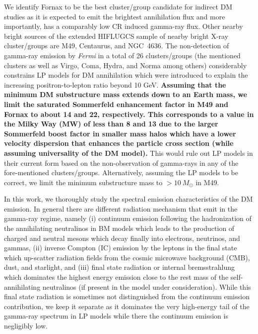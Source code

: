 \documentclass[10pt,aps,pra,reprint,amsmath,amsfonts,amssymb,showpacs,nofootinbib,floatfix]{revtex4-1}
\def\del#1{{}}
\def\C#1{{\bf #1}}
\newcommand{\Fermi}{{\em Fermi}\xspace}
\newcommand{\msun}{M_\odot}
\begin{document}
We identify Fornax to be the best cluster/group candidate for indirect
DM studies as it is expected to emit the brightest annihilation flux
and more importantly, has a comparably low CR induced gamma-ray flux.
\del{This in principle should allow to detect or constrain some BM
  models that have been chosen for the large gamma-ray flux yield with
  three-year \Fermi data (or constrain the substructure boost factor).}
Other nearby bright sources of the extended HIFLUGCS sample of nearby
bright X-ray cluster/groups are M49, Centaurus, and NGC~4636.  The
non-detection of gamma-ray emission by \Fermi in a total of 26
clusters/groups (the mentioned clusters as well as Virgo, Coma, Hydra,
and Norma among others) considerably constrains LP models for DM
annihilation which were introduced to explain the increasing
positron-to-lepton ratio beyond 10 GeV. \C{Assuming that the minimum
  DM substructure mass extends down to an Earth mass, we limit the
  saturated Sommerfeld enhancement factor in M49 and Fornax to about
  14 and 22, respectively. This corresponds to a value in the Milky
  Way (MW) of less than 8 and 13 due to the larger Sommerfeld boost
  factor in smaller mass halos which have a lower velocity dispersion
  that enhances the particle cross section (while assuming
  universality of the DM model).} This would rule out LP models in
  their current form based on the non-observation of gamma-rays in any
  of the fore-mentioned clusters/groups. Alternatively, assuming the
  LP models to be correct, we limit the minimum substructure mass to
  $>10~\msun$ in M49.

In this work, we thoroughly study the spectral emission
characteristics of the DM emission. In general there are different
radiation mechanism that emit in the gamma-ray regime, namely (i)
continuum emission following the hadronization of the annihilating
neutralinos in BM models which leads to the production of charged and
neutral mesons which decay finally into electrons, neutrinos, and
gammas, (ii) inverse Compton (IC) emission by the leptons in the final
state which up-scatter radiation fields from the cosmic microwave
background (CMB), dust, and starlight, and (iii) final state radiation
or internal bremsstrahlung which dominates the highest energy emission
close to the rest mass of the self-annihilating neutralinos (if
present in the model under consideration). While this final state
radiation is sometimes not distinguished from the continuum emission
contribution, we keep it separate as it dominates the very high-energy
tail of the gamma-ray spectrum in LP models while there the continuum
emission is negligibly low.
\end{document}
